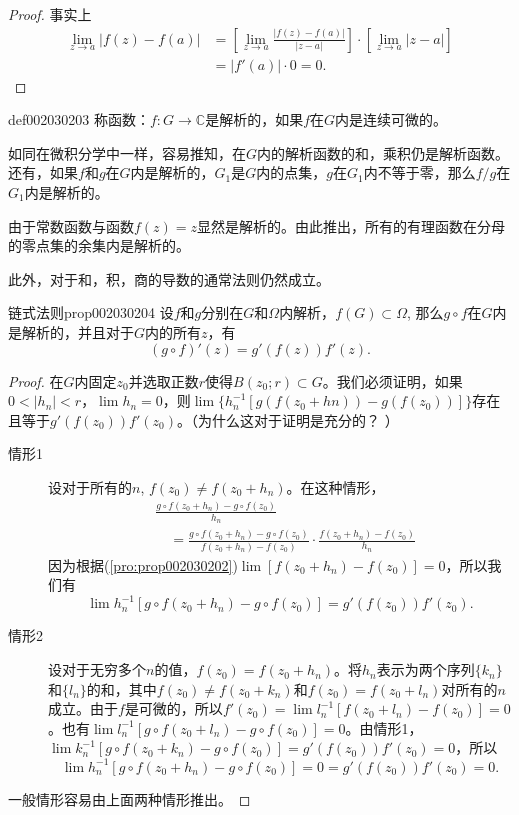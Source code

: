 \begin{proof}
事实上
\[
\begin{aligned}
\lim_{z \to a}{|f(z)-f(a)|} &=[\lim_{z \to a}{\frac{|f(z)-f(a)|}{|z-a|}}] \cdot [\lim_{z \to a}{|z-a|}] \\
&=|f'(a)| \cdot 0 = 0.
\end{aligned}
\]
\end{proof}

\begin{definition}{}{def002030203}
称函数：$f: G \to \mathbb{C}$是解析的，如果$f$在$G$内是连续可微的。
\end{definition}

如同在微积分学中一样，容易推知，在$G$内的解析函数的和，乘积仍是解析函数。还有，如果$f$和$g$在$G$内是解析的，$G_1$是$G$内的点集，$g$在$G_1$内不等于零，那么$f/g$在$G_1$内是解析的。

由于常数函数与函数$f(z)=z$显然是解析的。由此推出，所有的有理函数在分母的零点集的余集内是解析的。

此外，对于和，积，商的导数的通常法则仍然成立。
\begin{proposition}{链式法则}{prop002030204}
设$f$和$g$分别在$G$和$\Omega$内解析，$f(G) \subset \Omega$, 那么$g \circ f$在$G$内是解析的，并且对于$G$内的所有$z$，有
\[
(g \circ f)'(z) = g'(f(z))f'(z).
\]
\end{proposition}

\begin{proof}
在$G$内固定$z_0$并选取正数$r$使得$B(z_0; r) \subset G$。我们必须证明，如果$0 < |h_n| < r$，$\lim{h_n} = 0$，则$\lim\{h_n^{-1}[g(f(z_0+hn)) - g(f(z_0))]\}$存在且等于$g'(f(z_0))f'(z_0)$。（为什么这对于证明是充分的？ ）

\begin{description}
\item[情形1]设对于所有的$n$, $f(z_0) \neq f(z_0 + h_n)$。在这种情形，
\[
\begin{aligned}
&\frac{g \circ f(z_0 + h_n) - g \circ f(z_0)}{h_n} \\
&\quad = \frac{g \circ f(z_0 + h_n) - g \circ f(z_0)}{f(z_0+h_n) - f(z_0)} \cdot \frac{f(z_0+h_n) - f(z_0)}{h_n}
\end{aligned}
\]
因为根据(\ref{pro:prop002030202})$\lim{[f(z_0 + h_n) - f(z_0)]} = 0$，所以我们有
\[\lim{h_n^{-1}[g \circ f(z_0 + h_n) - g \circ f(z_0)]} = g'(f(z_0))f'(z_0).
\]
\item[情形2]设对于无穷多个$n$的值，$f(z_0) = f(z_0 + h_n)$。将$h_n$表示为两个序列$\{k_n\}$和$\{l_n\}$的和，其中$f(z_0) \neq f(z_0 + k_n)$和$f(z_0) = f(z_0 + l_n)$对所有的$n$成立。由于$f$是可微的，所以$f'(z_0) = \lim{l_n^{-1}[f(z_0 + l_n) - f(z_0)]} = 0$。也有$\lim{l_n^{-1}[g \circ f(z_0 + l_n) - g \circ f(z_0)]} = 0$。由情形1，$\lim{k_n^{-1}[g \circ f(z_0+k_n) - g \circ f(z_0)]} = g'(f(z_0))f'(z_0) = 0$，所以
\[
\lim{h_n^{-1}[g \circ f(z_0+h_n) - g \circ f(z_0)]} = 0 = g'(f(z_0))f'(z_0) = 0.
\]
\end{description}
一般情形容易由上面两种情形推出。
\end{proof}

